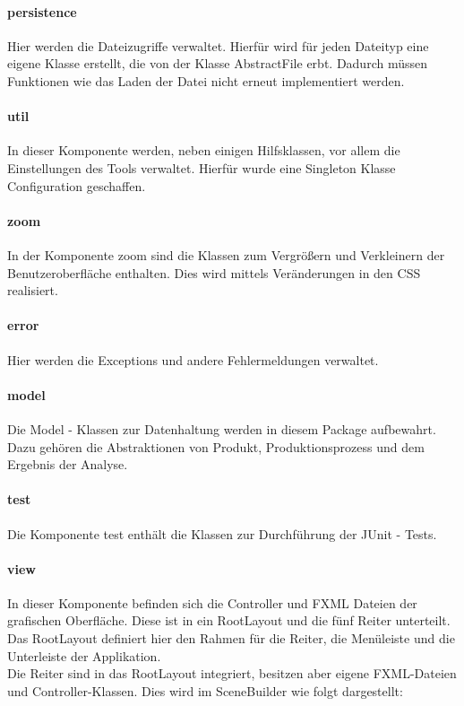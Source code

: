 \documentclass[12pt,a4paper, listof=entryprefix, bibliography=totocnumbered,toc=listofnumbered,lof=listofnumbered]{scrartcl}
\begin{document}
\paragraph{persistence}
Hier werden die Dateizugriffe verwaltet. Hierfür wird für jeden Dateityp eine eigene Klasse erstellt, die von der Klasse AbstractFile erbt. Dadurch müssen Funktionen wie das Laden der Datei nicht erneut implementiert werden.
\paragraph{util}
In dieser Komponente werden, neben einigen Hilfsklassen, vor allem die Einstellungen des Tools verwaltet. Hierfür wurde eine Singleton Klasse Configuration geschaffen.
\paragraph{zoom}
In der Komponente zoom sind die Klassen zum Vergrößern und Verkleinern der Benutzeroberfläche enthalten. Dies wird mittels Veränderungen in den \gls{CSS} realisiert.
\paragraph{error}
Hier werden die Exceptions und andere Fehlermeldungen verwaltet.
\paragraph{model}
Die Model - Klassen zur Datenhaltung werden in diesem Package aufbewahrt. Dazu gehören die Abstraktionen von Produkt, Produktionsprozess und dem Ergebnis der Analyse.
\paragraph{test}
Die Komponente test enthält die Klassen zur Durchführung der JUnit - Tests. 
\paragraph{view}
In dieser Komponente befinden sich die Controller und FXML Dateien der grafischen Oberfläche. Diese ist in ein RootLayout und die fünf Reiter unterteilt. Das RootLayout definiert hier den Rahmen für die Reiter, die Menüleiste und die Unterleiste der Applikation.
\\
Die Reiter sind in das RootLayout integriert, besitzen aber eigene FXML-Dateien und Controller-Klassen. Dies wird im SceneBuilder wie folgt dargestellt:
\end{document}
